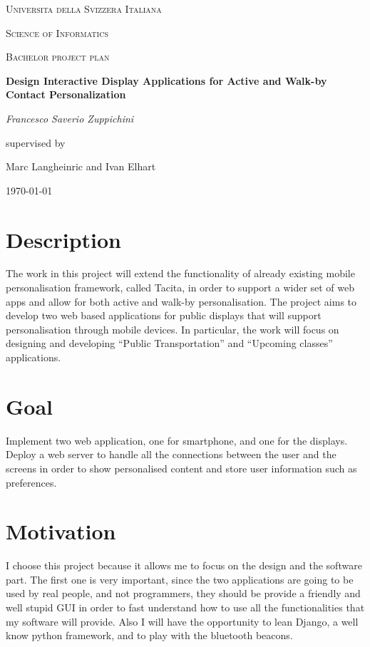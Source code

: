 \documentclass[11pt]{report}
\begin{document}
\begin{titlepage}
	\centering
	{\scshape\LARGE Universita della Svizzera Italiana\par}
		\vspace{0.5cm}

	{\scshape Science of Informatics\par}
	\vspace{1cm}
	{\scshape\Large Bachelor project plan\par}
	\vspace{1.5cm}
	{\huge\bfseries Design Interactive Display Applications for Active and Walk-by Contact Personalization\par}
	\vspace{2cm}
	{\Large\itshape Francesco Saverio Zuppichini\par}
	\vfill
	supervised by\par
	Marc Langheinric and
	Ivan Elhart
	\vfill

	{\large \today\par}
\end{titlepage}
%
\section*{Description}
The work in this project will extend the functionality of already existing mobile personalisation framework, called Tacita, in order to support a wider set of web apps and allow for both active and walk-by personalisation. The project aims to develop two web based applications for public displays that will support personalisation through mobile devices. In particular, the work will focus on designing and developing “Public Transportation” and “Upcoming classes” applications. 
\section*{Goal}
Implement two web application, one for smartphone, and one for the displays. Deploy a web server to handle all the connections between the user and the screens in order to show personalised content and store user information such as preferences. 
\section*{Motivation}
I choose this project because it allows me to focus on the design and the software part. The first one is very important, since the two applications are going to be used by real people, and not programmers, they should be provide a friendly and well stupid GUI in order to fast understand how to use all the functionalities that my software will provide. Also I will have the opportunity to lean Django, a well know python framework, and to play with the bluetooth beacons.
\end{document}
